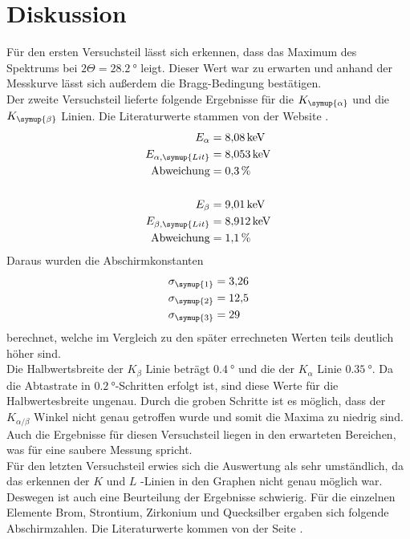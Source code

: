 \section{Diskussion}
\label{sec:Diskussion}

Für den ersten Versuchsteil lässt sich erkennen, dass das Maximum des Spektrums
bei $2 \Theta = \SI{28.2}{\degree}$ leigt. Dieser Wert war zu erwarten und anhand der
Messkurve lässt sich außerdem die Bragg-Bedingung bestätigen.\\
Der zweite Versuchsteil lieferte folgende Ergebnisse für die $K_\symup{\alpha}$ und
die $K_\symup{\beta}$ Linien. Die Literaturwerte stammen von der Website \cite{alpha}.\\
\begin{align*}
  E_\alpha &= \SI{8.08}{\kilo\eV}\\
  E_{\alpha,\symup{Lit}} &= \SI{8.053}{\kilo\eV}\\
  \text{Abweichung} &= \SI{0.3}{\percent}\\\\
  E_\beta &= \SI{9.01}{\kilo\eV}\\
  E_{\beta,\symup{Lit}} &= \SI{8.912}{\kilo\eV}\\
  \text{Abweichung} &= \SI{1.1}{\percent}\\
\end{align*}
Daraus wurden die Abschirmkonstanten
\begin{align*}
  \sigma_\symup{1} &= \num{3.26} \\
  \sigma_\symup{2} &= \num{12.5} \\
  \sigma_\symup{3} &= \num{29}
\end{align*}
berechnet, welche im Vergleich zu den später errechneten Werten teils deutlich höher sind. \\
Die Halbwertsbreite der $K_\beta$ Linie beträgt $\SI{0.4}{\degree}$ und die der
$K_\alpha$ Linie $\SI{0.35}{\degree}$. Da die Abtastrate in $\SI{0.2}{\degree}$-Schritten erfolgt
ist, sind diese Werte für die Halbwertesbreite ungenau. Durch die groben Schritte ist es möglich,
dass der
$K_{\alpha/\beta}$ Winkel nicht genau getroffen wurde und somit die Maxima zu niedrig sind.\\
Auch die Ergebnisse für diesen Versuchsteil liegen in den erwarteten Bereichen,
was für eine saubere Messung spricht.\\
Für den letzten Versuchsteil erwies sich die Auswertung als sehr umständlich, da
das erkennen der $K$ und $L$ -Linien in den Graphen nicht genau möglich war. Deswegen
ist auch eine Beurteilung der Ergebnisse schwierig. Für die einzelnen
Elemente Brom, Strontium, Zirkonium und Quecksilber ergaben sich folgende
Abschirmzahlen. Die Literaturwerte kommen von der Seite \cite{k_edge}.

